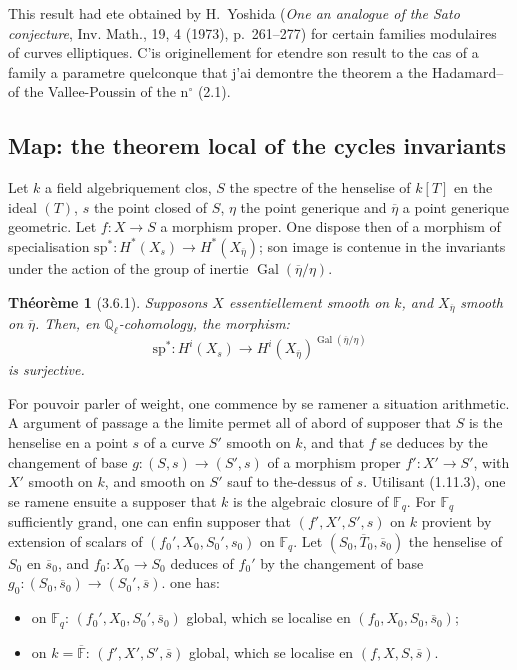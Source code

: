 \documentclass[12pt,a4paper]{article}
\theoremstyle{plain}
\newtheorem{theorem}{Th\'eor\`eme}[section]
\theoremstyle{definition}
\theoremstyle{remark}
\DeclareMathOperator{\Gal}{Gal}
\newcommand{\FF}{{\mathbb{F}}}
\newcommand{\QQ}{{\mathbb{Q}}}
\begin{document}
This result had ete obtained by H.~Yoshida (\textit{One an analogue of the Sato conjecture}, Inv. Math., 19, 4 (1973), p.~261--277) for certain families modulaires of curves elliptiques. C'is originellement for etendre son result to the cas of a family a parametre quelconque that j'ai demontre the theorem a the Hadamard--of the Vallee-Poussin of the n$^\circ$ (2.1).


\subsection{Map: the theorem local of the cycles invariants}

Let $k$ a field algebriquement clos, $S$ the spectre of the henselise of $k[T]$ en the ideal $(T)$, $s$ the point closed of $S$, $\eta$ the point generique and $\overline{\eta}$ a point generique geometric. Let $f : X \to S$ a morphism proper. One dispose then of a morphism of specialisation $\mathrm{sp}^* : H^*(X_s) \to H^*(X_{\overline{\eta}})$; son image is contenue in the invariants under the action of the group of inertie $\Gal(\overline{\eta}/\eta)$.

\begin{theorem}[3.6.1]
Supposons $X$ essentiellement smooth on $k$, and $X_{\overline{\eta}}$ smooth on $\overline{\eta}$. Then, en $\QQ_\ell$-cohomology, the morphism:
\[ \mathrm{sp}^* : H^i(X_s) \to H^i(X_{\overline{\eta}})^{\Gal(\overline{\eta}/\eta)} \]
is surjective.
\end{theorem}

For pouvoir parler of weight, one commence by se ramener a situation arithmetic. A argument of passage a the limite permet all of abord of supposer that $S$ is the henselise en a point $s$ of a curve $S'$ smooth on $k$, and that $f$ se deduces by the changement of base $g : (S, s) \to (S', s)$ of a morphism proper $f' : X' \to S'$, with $X'$ smooth on $k$, and smooth on $S'$ sauf to the-dessus of $s$. Utilisant (1.11.3), one se ramene ensuite a supposer that $k$ is the algebraic closure of $\FF_q$. For $\FF_q$ sufficiently grand, one can enfin supposer that $(f', X', S', s)$ on $k$ provient by extension of scalars of $(f_0', X_0, S_0', s_0)$ on $\FF_q$. Let $(S_0, \overline{T}_0, \overline{s}_0)$ the henselise of $S_0$ en $\overline{s}_0$, and $f_0 : X_0 \to S_0$ deduces of $f_0'$ by the changement of base $g_0 : (S_0, \overline{s}_0) \to (S_0', \overline{s})$. one has:
\begin{itemize}
\item on $\FF_q$: $(f_0', X_0, S_0', \overline{s}_0)$ global, which se localise en $(f_0, X_0, S_0, \overline{s}_0)$;
\item on $k = \overline{\FF}$: $(f', X', S', \overline{s})$ global, which se localise en $(f, X, S, \overline{s})$.
\end{itemize}
\end{document}
